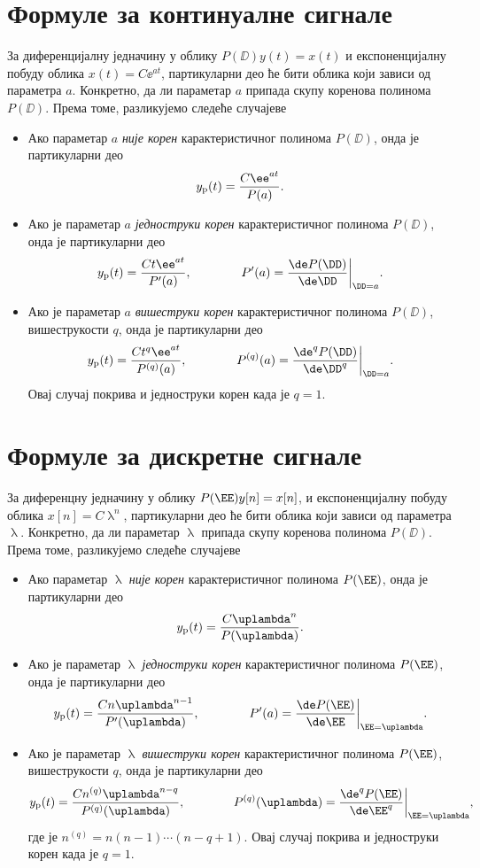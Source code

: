 \section*{Формуле за континуалне сигнале}

За диференцијалну једначину у облику $P(\DD) y(t) = x(t)$ и експоненцијалну побуду облика 
$x(t) = C \ee^{at}$, партикуларни део ће бити облика који зависи од параметра $a$. Конкретно, да ли параметар $a$ припада скупу 
коренова полинома $P(\DD)$. Према томе, разликујемо следеће случајеве
\begin{itemize}
    \item Ако параметар $a$ \emph{није корен} карактеристичног полинома $P(\DD)$, онда је партикуларни део 
    $$
        y_{\rm p}(t) = \dfrac{C\ee^{at}}{P(a)}.
    $$
    \item Ако је параметар $a$ \emph{једноструки корен} карактеристичног полинома $P(\DD)$, онда је партикуларни део 
    $$
        y_{\rm p}(t) = \dfrac{Ct\ee^{at}}{P'(a)}, \qquad\qquad P'(a) = \dfrac{\de P(\DD)}{\de \DD}\bigg\vert_{\DD = a}.
    $$
    \item Ако је параметар $a$ \emph{вишеструки корен} карактеристичног полинома $P(\DD)$, вишеструкости $q$, онда је партикуларни део 
    $$
    y_{\rm p}(t) = \dfrac{Ct^q\ee^{at}}{P^{(q)}(a)}, \qquad\qquad P^{(q)}(a) = \dfrac{\de^q P(\DD)}{\de \DD^q}\bigg\vert_{\DD = a}.
    $$
    Овај случај покрива и једноструки корен када је $q = 1$.
\end{itemize} 

\section*{Формуле за дискретне сигнале}

За диференцну једначину у облику $P(\EE) y[n] = x[n]$, и експоненцијалну побуду облика 
$x[n] = C\uplambda^{n}$, партикуларни део ће бити облика који зависи од параметра $\uplambda$. Конкретно, да ли параметар $\uplambda$ припада скупу 
коренова полинома $P(\DD)$. Према томе, разликујемо следеће случајеве
\begin{itemize}
    \item Ако параметар $\uplambda$ \emph{није корен} карактеристичног полинома $P(\EE)$, онда је партикуларни део 
    $$
        y_{\rm p}(t) = \dfrac{C \uplambda^n }{P(\uplambda)}.
    $$
    \item Ако је параметар $\uplambda$ \emph{једноструки корен} карактеристичног полинома $P(\EE)$, онда је партикуларни део 
    $$
        y_{\rm p}(t) = \dfrac{C n \uplambda^{n-1} }{P'(\uplambda)}, \qquad\qquad P'(a) = \dfrac{\de P(\EE)}{\de \EE}\bigg\vert_{\EE = \uplambda}.
    $$
    \item Ако је параметар $\uplambda$ \emph{вишеструки корен} карактеристичног полинома $P(\EE)$, вишеструкости $q$, онда је партикуларни део 
    $$
    y_{\rm p}(t) = \dfrac{Cn^{(q)}\uplambda^{n - q} }{P^{(q)}(\uplambda)}, \qquad\qquad P^{(q)}(\uplambda) = \dfrac{\de^q P(\EE)}{\de \EE^q}\bigg\vert_{\EE = \uplambda},
    $$
    где је $n^{(q)} = n(n-1)\cdots(n-q+1)$. Овај случај покрива и једноструки корен када је $q = 1$.
\end{itemize} 
